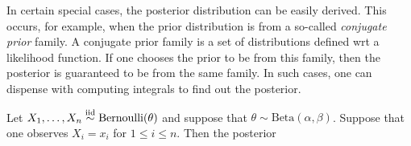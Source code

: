In certain special cases, the posterior distribution can be easily derived. This 
occurs, for example, when the prior distribution is from a so-called 
\emph{conjugate prior} family. A conjugate prior family is a set of distributions
defined wrt a likelihood function. If one chooses the prior to be from this 
family, then the posterior is guaranteed to be from the same family. In such 
cases, one can dispense with computing integrals to find out the posterior. 

\begin{example} \label{ex:BetaBinomial}
Let $X_1, \ldots, X_n \stackrel{\text{iid}}{\sim} \text{Bernoulli}(\theta)$ and suppose that 
$\theta \sim \text{Beta}(\alpha, \beta)$. Suppose that one observes $X_i = x_i$
for $1 \leq i \leq n$. Then the posterior 
\end{example}  

